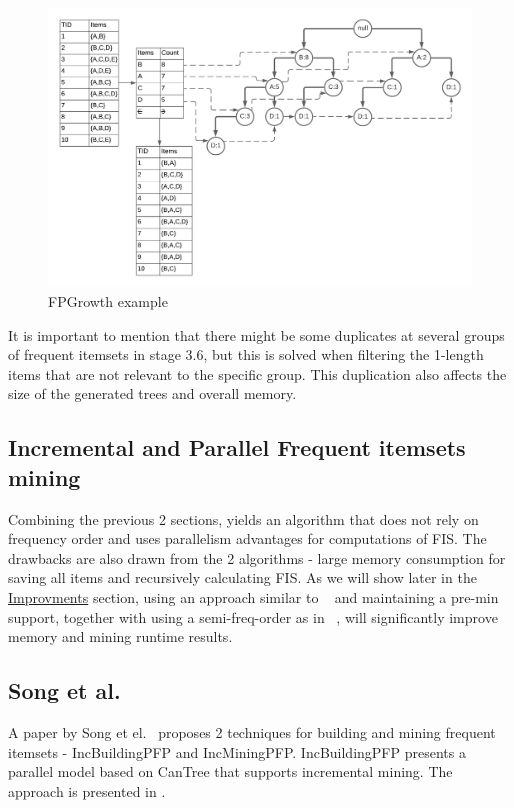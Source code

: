 \begin{figure}
  \centering
  \includegraphics[width=\linewidth]{figures/FPTree}
  \caption{FPGrowth example}
  \label{fig:fpgrowthexample}
\end{figure}


It is important to mention that there might be some duplicates at several groups of frequent itemsets in stage 3.6, but this is solved when filtering the 1-length items that are not relevant to the specific group. This duplication also affects the size of the generated trees and overall memory.

\subsection{Incremental and Parallel Frequent itemsets mining}

Combining the previous 2 sections, yields an algorithm that does not rely on frequency order and uses parallelism advantages for computations of FIS.
The drawbacks are also drawn from the 2 algorithms - large memory consumption for saving all items and recursively calculating FIS. As we will show later in the \hyperref[sec:improvements]{Improvments} section, using an approach similar to ~\cite{kohefficient} and maintaining a pre-min support, together with using a semi-freq-order as in ~\cite{tanbeer2009efficient}, will significantly improve memory and mining runtime results.

\subsection{Song et al. }
A paper by Song et el.~\cite{song2017} proposes 2 techniques for building and mining frequent itemsets - IncBuildingPFP and IncMiningPFP. IncBuildingPFP presents a parallel model based on CanTree that supports incremental mining. The approach is presented in %
.  


